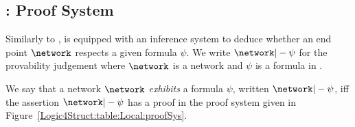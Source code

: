 \subsection{\texorpdfstring{\LL}{LL} : Proof System}


Similarly to \GL, \LL is equipped with an inference system to deduce
whether an end point $\network$ respects a given formula $\psi$. We
write $ \network |- \psi $ for the provability judgement where
$\network$ is a network and $\psi$ is a formula in \LL.

\begin{definition}
  We say that a network $\network$ \emph{exhibits} a formula $\psi$,
  written $\network |- \psi$, iff the assertion $\network |- \psi$ has
  a proof in the proof system given in
  Figure~\ref{Logic4Struct:table:Local:proofSys}.
\end{definition}


